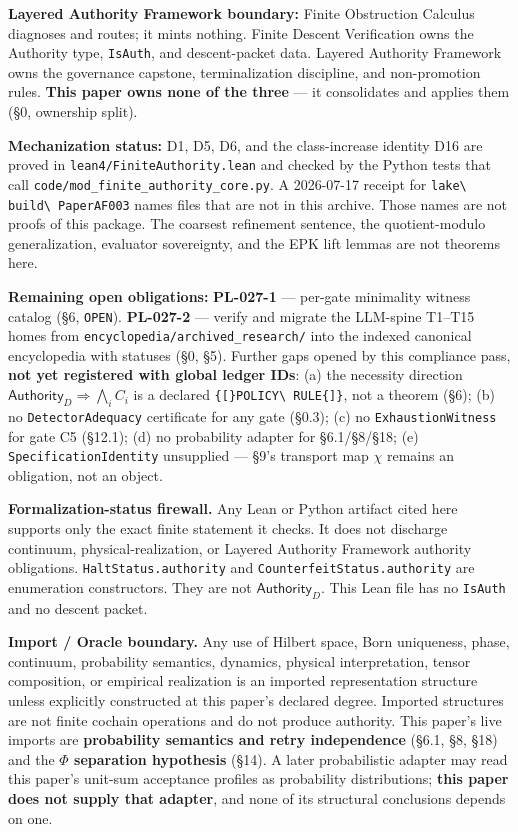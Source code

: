 \documentclass[
  10pt,
]{article}
\DeclareRobustCommand{\texttt}[1]{{\paperSymbolFont\nolinkurl{#1}}}
\begin{document}
\textbf{Layered Authority Framework boundary:} Finite Obstruction Calculus diagnoses and routes; it mints nothing. Finite Descent Verification owns the Authority type, \texttt{IsAuth}, and descent-packet data. Layered Authority Framework owns the governance capstone, terminalization discipline, and non-promotion rules. \textbf{This paper owns none of the three} --- it consolidates and applies them (§0, ownership split).

\textbf{Mechanization status:} D1, D5, D6, and the class-increase identity D16 are proved in \texttt{lean4/FiniteAuthority.lean} and checked by the Python tests that call \texttt{code/mod\_finite\_authority\_core.py}. A 2026-07-17 receipt for \texttt{lake\ build\ PaperAF003} names files that are not in this archive. Those names are not proofs of this package. The coarsest refinement sentence, the quotient-modulo generalization, evaluator sovereignty, and the EPK lift lemmas are not theorems here.

\textbf{Remaining open obligations:} \textbf{PL-027-1} --- per-gate minimality witness catalog (§6, \texttt{OPEN}). \textbf{PL-027-2} --- verify and migrate the LLM-spine T1--T15 homes from \texttt{encyclopedia/archived\_research/} into the indexed canonical encyclopedia with statuses (§0, §5). Further gaps opened by this compliance pass, \textbf{not yet registered with global ledger IDs}: (a) the necessity direction \protect\hypertarget{math-E0180-0251}{}{\(\mathsf{Authority}_D\Rightarrow\bigwedge_i C_i\)} is a declared \texttt{{[}POLICY\ RULE{]}}, not a theorem (§6); (b) no \texttt{DetectorAdequacy} certificate for any gate (§0.3); (c) no \texttt{ExhaustionWitness} for gate C5 (§12.1); (d) no probability adapter for §6.1/§8/§18; (e) \texttt{SpecificationIdentity} unsupplied --- §9's transport map \protect\hypertarget{math-E0013-0252}{}{\(\chi\)} remains an obligation, not an object.

\textbf{Formalization-status firewall.} Any Lean or Python artifact cited here supports only the exact finite statement it checks. It does not discharge continuum, physical-realization, or Layered Authority Framework authority obligations. \texttt{HaltStatus.authority} and \texttt{CounterfeitStatus.authority} are enumeration constructors. They are not \protect\hypertarget{math-E0010-0253}{}{\(\mathsf{Authority}_D\)}. This Lean file has no \texttt{IsAuth} and no descent packet.

\textbf{Import / Oracle boundary.} Any use of Hilbert space, Born uniqueness, phase, continuum, probability semantics, dynamics, physical interpretation, tensor composition, or empirical realization is an imported representation structure unless explicitly constructed at this paper's declared degree. Imported structures are not finite cochain operations and do not produce authority. This paper's live imports are \textbf{probability semantics and retry independence} (§6.1, §8, §18) and the \textbf{\protect\hypertarget{math-E0005-0254}{}{\(\Phi\)} separation hypothesis} (§14). A later probabilistic adapter may read this paper's unit-sum acceptance profiles as probability distributions; \textbf{this paper does not supply that adapter}, and none of its structural conclusions depends on one.
\end{document}
